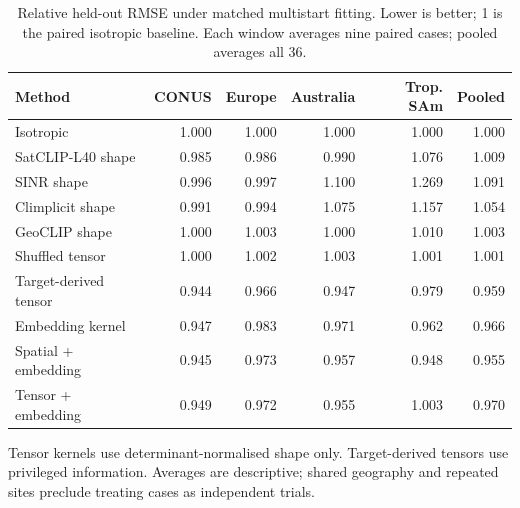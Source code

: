 \begin{table}[htbp]\centering\small
\caption{Relative held-out RMSE under matched multistart fitting. Lower is better; 1 is the paired isotropic baseline. Each window averages nine paired cases; pooled averages all 36.}
\label{tab:krig}
\begin{tabular}{@{}lrrrrr@{}}
\toprule
Method&CONUS&Europe&Australia&Trop. SAm&Pooled\\\midrule
Isotropic&1.000&1.000&1.000&1.000&1.000\\
SatCLIP-L40 shape&0.985&0.986&0.990&1.076&1.009\\
SINR shape&0.996&0.997&1.100&1.269&1.091\\
Climplicit shape&0.991&0.994&1.075&1.157&1.054\\
GeoCLIP shape&1.000&1.003&1.000&1.010&1.003\\
Shuffled tensor&1.000&1.002&1.003&1.001&1.001\\
Target-derived tensor&0.944&0.966&0.947&0.979&0.959\\
Embedding kernel&0.947&0.983&0.971&0.962&0.966\\
Spatial + embedding&0.945&0.973&0.957&0.948&0.955\\
Tensor + embedding&0.949&0.972&0.955&1.003&0.970\\
\bottomrule\end{tabular}
\par\smallskip\parbox{.97\textwidth}{\footnotesize Tensor kernels use determinant-normalised shape only. Target-derived tensors use privileged information. Averages are descriptive; shared geography and repeated sites preclude treating cases as independent trials.}
\end{table}

